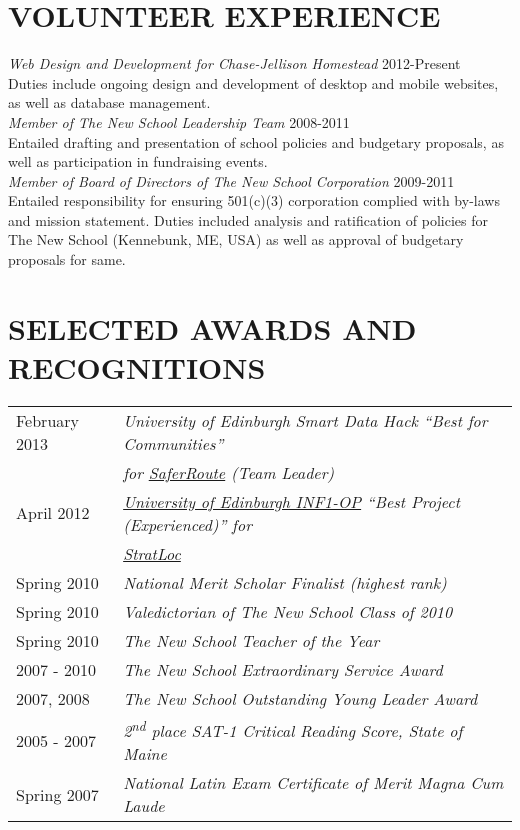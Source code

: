 \documentclass[line, margin]{res}
\newcommand{\ts}{\textsuperscript}
\begin{document}
\begin{resume}
\section{VOLUNTEER EXPERIENCE}
\textit{Web Design and Development for Chase-Jellison Homestead} \hfill 2012-Present \\Duties include ongoing design and development of desktop and mobile websites, as well as database management. \\[5pt]
\textit{Member of The New School Leadership Team} \hfill 2008-2011 \\
Entailed drafting and presentation of school policies and budgetary proposals, as well as participation in fundraising events. \\[5pt]
\textit{Member of Board of Directors of The New School Corporation} \hfill 2009-2011 \\
Entailed responsibility for ensuring 501(c)(3) corporation complied with by-laws and mission statement. Duties included analysis and ratification of policies for The New School (Kennebunk, ME, USA) as well as approval of budgetary proposals for same. 

\section{SELECTED AWARDS AND RECOGNITIONS}
\begin{tabular}{@{}l l}
February 2013 & \textit{University of Edinburgh Smart Data Hack ``Best for Communities''}\linebreak\\[1pt] 
&\textit{for \href{https://github.com/team-tusive/ilwhack}{SaferRoute} (Team Leader)} \linebreak \\[5pt]
April 2012 & \textit{\href{https://sites.google.com/site/2012oop/winners}{University of Edinburgh INF1-OP} ``Best Project (Experienced)'' for} \linebreak \\[1pt] 
 &\textit{\href{http://www.chasestevens.com/team2civ/}{StratLoc}} \linebreak \\[5pt]
Spring 2010 & \textit{National Merit Scholar Finalist (highest rank)} \\[5pt]
Spring 2010 & \textit{Valedictorian of The New School Class of 2010} \\[5pt]
Spring 2010 & \textit{The New School Teacher of the Year} \\[5pt]
2007 - 2010 & \textit{The New School Extraordinary Service Award} \\[5pt]
2007, 2008 & \textit{The New School Outstanding Young Leader Award} \\[5pt]
2005 - 2007 & \textit{2\ts{nd} place SAT-1 Critical Reading Score, State of Maine} \\[5pt]
Spring 2007 & \textit{National Latin Exam Certificate of Merit Magna Cum Laude}
\end{tabular}
\end{resume}
\end{document}
